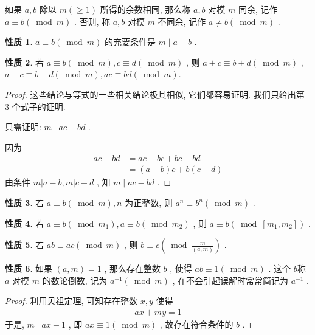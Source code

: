 \documentclass[aspectratio=169]{ctexbeamer}
\theoremstyle{definition}
\newtheorem{property}{性质}[section]
\begin{document}
\begin{frame}[t]
	\begin{definition}
		如果 $a ,  b$ 除以 $m(\geqslant 1)$ 所得的余数相同, 那么称 $a ,  b$ 对模 $m$ 同余, 记作 $a \equiv b(\bmod m)$ . 否则, 称 $a ,  b$ 对模 $m$ 不同余, 记作 $a \neq b(\bmod m)$ .
	\end{definition}
	\begin{property}
		$a \equiv b(\bmod m)$ 的充要条件是 $m \mid a-b$ .
	\end{property}
\end{frame}

\begin{frame}[t]
	\begin{property}
		若 $a \equiv b(\bmod m), c \equiv d(\bmod m)$ , 则 $a+c \equiv b+d(\bmod m)$ ,  $a-c \equiv b-d(\bmod m), a c \equiv b d(\bmod m)$.
	\end{property}
	\pause
	\begin{proof}
		这些结论与等式的一些相关结论极其相似, 它们都容易证明. 我们只给出第 3 个式子的证明.

		只需证明:  $m \mid a c-b d$ .

		因为
		\begin{align}
			a c-b d & =a c-b c+b c-b d \\
			        & =(a-b) c+b(c-d)
		\end{align}
		由条件 $m|a-b, m| c-d$ , 知 $m \mid a c-b d$ .
	\end{proof}
\end{frame}

\begin{frame}[t]
	\begin{property}
		若 $a \equiv b(\bmod m), n$ 为正整数, 则 $a^{n} \equiv b^{n}(\bmod m)$ .
	\end{property}
	\begin{property}
		若 $a \equiv b\left(\bmod m_{1}\right), a \equiv b\left(\bmod m_{2}\right)$ , 则 $a \equiv b\left(\bmod \left[m_{1}, m_{2}\right]\right)$ .
	\end{property}
	\begin{property}
		若 $a b \equiv a c(\bmod m)$ , 则 $b \equiv c\left(\bmod \frac{m}{(a, m)}\right)$ .
	\end{property}
\end{frame}

\begin{frame}[t]
	\begin{property}
		如果 $(a, m)=1$ , 那么存在整数 $b$ , 使得 $a b \equiv 1(\bmod m)$ . 这个 $b$称 $a$ 对模 $m$ 的数论倒数, 记为 $a^{-1}(\bmod m)$ , 在不会引起误解时常常简记为 $a^{-1}$ .
	\end{property}
	\begin{proof}
		利用贝祖定理, 可知存在整数 $x ,  y$ 使得
		\begin{align*}
			a x+m y=1
		\end{align*}
		于是,  $m \mid a x-1$ , 即 $a x \equiv 1(\bmod m)$ , 故存在符合条件的 $b$ .
	\end{proof}
\end{frame}
\end{document}
